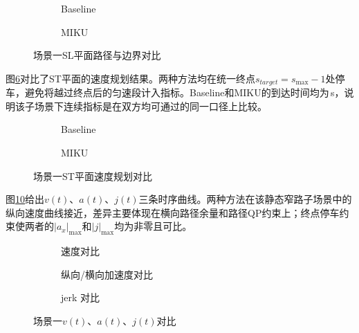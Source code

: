 \begin{figure}[H]
\centering
\begin{subfigure}[b]{\textwidth}
  \centering
  
  \caption{Baseline}
  \label{fig:exp_ch5_sl:a}
\end{subfigure}

\begin{subfigure}[b]{\textwidth}
  \centering
  
  \caption{MIKU}
  \label{fig:exp_ch5_sl:b}
\end{subfigure}
\caption{场景一SL平面路径与边界对比}
\label{fig:exp_ch5_sl}
\end{figure}

图\ref{fig:exp_ch5_st}对比了ST平面的速度规划结果。两种方法均在统一终点$s_{target}=s_{\max}-1$处停车，避免将越过终点后的匀速段计入指标。Baseline和MIKU的到达时间均为\MSevenMikuTArrive\,s，说明该子场景下连续指标是在双方均可通过的同一口径上比较。

\begin{figure}[H]
\centering
\begin{subfigure}[b]{0.48\textwidth}
  \centering
  
  \caption{Baseline}
  \label{fig:exp_ch5_st:a}
\end{subfigure}\hfill
\begin{subfigure}[b]{0.48\textwidth}
  \centering
  
  \caption{MIKU}
  \label{fig:exp_ch5_st:b}
\end{subfigure}
\caption{场景一ST平面速度规划对比}
\label{fig:exp_ch5_st}
\end{figure}

图\ref{fig:exp_ch5_va}给出$v(t)$、$a(t)$、$j(t)$三条时序曲线。两种方法在该静态窄路子场景中的纵向速度曲线接近，差异主要体现在横向路径余量和路径QP约束上；终点停车约束使两者的$|a_x|_{\max}$和$|j|_{\max}$均为非零且可比。

\begin{figure}[H]
\centering
\begin{subfigure}[b]{\textwidth}
  \centering
  
  \caption{速度对比}
  \label{fig:exp_ch5_va:a}
\end{subfigure}

\begin{subfigure}[b]{\textwidth}
  \centering
  
  \caption{纵向/横向加速度对比}
  \label{fig:exp_ch5_va:b}
\end{subfigure}

\begin{subfigure}[b]{\textwidth}
  \centering
  
  \caption{jerk 对比}
  \label{fig:exp_ch5_va:c}
\end{subfigure}
\caption{场景一$v(t)$、$a(t)$、$j(t)$对比}
\label{fig:exp_ch5_va}
\end{figure}


